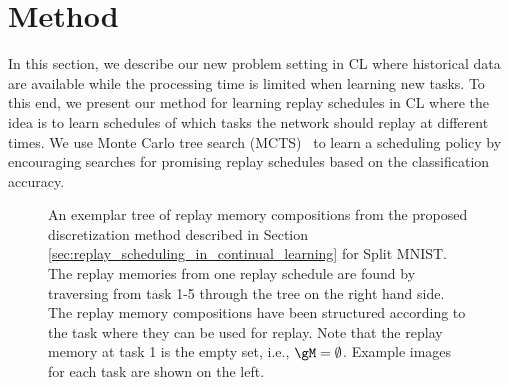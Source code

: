 
\section{Method}\label{sec:method}


In this section, we describe our new problem setting in CL where historical data are available while the processing time is limited when learning new tasks. To this end, we present our method for learning replay schedules in CL where the idea is to learn schedules of which tasks the network should replay at different times. 
We use Monte Carlo tree search (MCTS)~\citep{coulom2006efficient} to learn a scheduling policy by encouraging searches for promising replay schedules based on the classification accuracy. 



\begin{figure*}[t]
\centering 
\setlength{\figwidth}{.77\textwidth}
\setlength{\figheight}{.3\textheight}

\vspace{-2mm}
\caption{An exemplar tree of replay memory compositions from the proposed discretization method described in Section \ref{sec:replay_scheduling_in_continual_learning} for Split MNIST. The replay memories from one replay schedule are found by traversing from task 1-5 through the tree on the right hand side. The replay memory compositions have been structured according to the task where they can be used for replay. Note that the replay memory at task 1 is the empty set, i.e., $\gM = \emptyset$. Example images for each task are shown on the left.
}
\vspace{-3mm}
\label{fig:replay_scheduling_mcts_tree_example}
\end{figure*}










